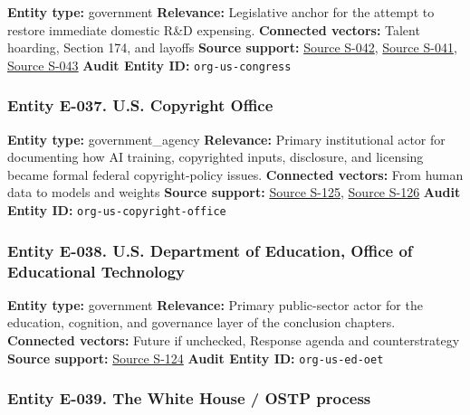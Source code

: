 \documentclass[
  american,
  11pt,
  letterpaper,
]{article}
\begin{document}
\textbf{Entity type:} government \textbf{Relevance:} Legislative anchor
for the attempt to restore immediate domestic R\&D expensing.
\textbf{Connected vectors:} Talent hoarding, Section 174, and layoffs
\textbf{Source support:}
\hyperref[source-s-042-h-r-7024-tax-relief-for-american-families-and-workers-act-of-2024]{Source
S-042},
\hyperref[source-s-041-h-r-7024-tax-relief-for-american-families-and-workers-act-of-2024-crs-summary]{Source
S-041},
\hyperref[source-s-043-h-r-7024-text-deduction-for-domestic-research-and-experimental-expenditures]{Source
S-043} \textbf{Audit Entity ID:} \texttt{org-us-congress}

\subsubsection{Entity E-037. U.S. Copyright
Office}\label{entity-e-037-u-s-copyright-office}

\textbf{Entity type:} government\_agency \textbf{Relevance:} Primary
institutional actor for documenting how AI training, copyrighted inputs,
disclosure, and licensing became formal federal copyright-policy issues.
\textbf{Connected vectors:} From human data to models and weights
\textbf{Source support:}
\hyperref[source-s-125-copyright-and-artificial-intelligence-notice-of-inquiry]{Source
S-125},
\hyperref[source-s-126-copyright-and-artificial-intelligence-part-3-generative-ai-training-pre-publication-version]{Source
S-126} \textbf{Audit Entity ID:} \texttt{org-us-copyright-office}

\subsubsection{Entity E-038. U.S. Department of Education, Office of
Educational
Technology}\label{entity-e-038-u-s-department-of-education-office-of-educational-technology}

\textbf{Entity type:} government \textbf{Relevance:} Primary
public-sector actor for the education, cognition, and governance layer
of the conclusion chapters. \textbf{Connected vectors:} Future if
unchecked, Response agenda and counterstrategy \textbf{Source support:}
\hyperref[source-s-124-artificial-intelligence-and-the-future-of-teaching-and-learning-insights-and-recommendations]{Source
S-124} \textbf{Audit Entity ID:} \texttt{org-us-ed-oet}

\subsubsection{Entity E-039. The White House / OSTP
process}\label{entity-e-039-the-white-house-ostp-process}
\end{document}
